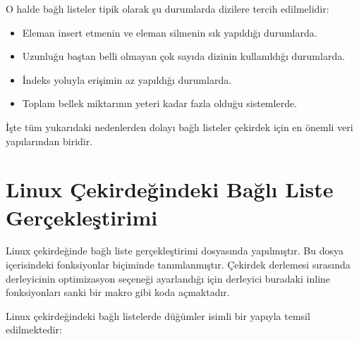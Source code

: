 \documentclass[a4paper,10pt,turkish]{sphinxmanual}
\begin{document}
\sphinxAtStartPar
O halde bağlı listeler tipik olarak şu durumlarda dizilere tercih edilmelidir:
\begin{itemize}
\item {} 
\sphinxAtStartPar
Eleman insert etmenin ve eleman silmenin sık yapıldığı durumlarda.

\item {} 
\sphinxAtStartPar
Uzunluğu baştan belli olmayan çok sayıda dizinin kullanıldığı durumlarda.

\item {} 
\sphinxAtStartPar
İndeks yoluyla erişimin az yapıldığı durumlarda.

\item {} 
\sphinxAtStartPar
Toplam bellek miktarının yeteri kadar fazla olduğu sistemlerde.

\end{itemize}

\sphinxAtStartPar
İşte tüm yukarıdaki nedenlerden dolayı bağlı listeler çekirdek için en önemli veri yapılarından biridir.


\section{Linux Çekirdeğindeki Bağlı Liste Gerçekleştirimi}
\label{\detokenize{kernellinkedlistandhashtable:linux-cekirdegindeki-bagli-liste-gerceklestirimi}}
\sphinxAtStartPar
Linux çekirdeğinde bağlı liste gerçekleştirimi  dosyasında yapılmıştır. Bu dosya
içerisindeki fonksiyonlar  biçiminde tanımlanmıştır. Çekirdek derlemesi sırasında
derleyicinin optimizasyon seçeneği ayarlandığı için derleyici buradaki inline fonksiyonları sanki bir makro
gibi koda açmaktadır.

\sphinxAtStartPar
Linux çekirdeğindeki bağlı listelerde düğümler  isimli bir yapıyla temsil edilmektedir:

\begin{sphinxVerbatim}[commandchars=\\\{\}]
\end{sphinxVerbatim}
\end{document}
